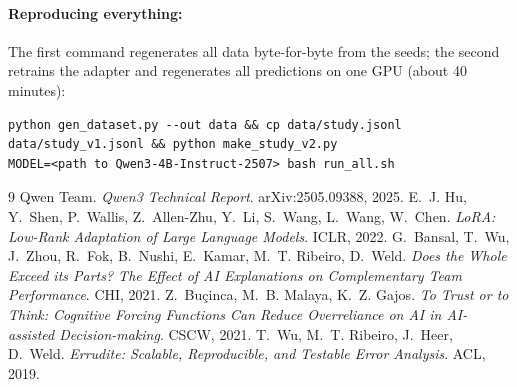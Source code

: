 \documentclass[11pt]{article}
\begin{document}
\paragraph{Reproducing everything:} The first command regenerates all data byte-for-byte from the
seeds; the second retrains the adapter and regenerates all predictions on one GPU (about 40
minutes):
\begin{Verbatim}[fontsize=\small]
python gen_dataset.py --out data && cp data/study.jsonl data/study_v1.jsonl && python make_study_v2.py
MODEL=<path to Qwen3-4B-Instruct-2507> bash run_all.sh
\end{Verbatim}

\begin{thebibliography}{9}
 Qwen Team. \emph{Qwen3 Technical Report}. arXiv:2505.09388, 2025.
 E.~J. Hu, Y.~Shen, P.~Wallis, Z.~Allen-Zhu, Y.~Li, S.~Wang, L.~Wang, W.~Chen.
\emph{LoRA: Low-Rank Adaptation of Large Language Models}. ICLR, 2022.
 G.~Bansal, T.~Wu, J.~Zhou, R.~Fok, B.~Nushi, E.~Kamar, M.~T. Ribeiro, D.~Weld.
\emph{Does the Whole Exceed its Parts? The Effect of AI Explanations on Complementary Team
Performance}. CHI, 2021.
 Z.~Bu\c{c}inca, M.~B. Malaya, K.~Z. Gajos. \emph{To Trust or to Think: Cognitive
Forcing Functions Can Reduce Overreliance on AI in AI-assisted Decision-making}. CSCW, 2021.
 T.~Wu, M.~T. Ribeiro, J.~Heer, D.~Weld. \emph{Errudite: Scalable, Reproducible,
and Testable Error Analysis}. ACL, 2019.
\end{thebibliography}
\end{document}
